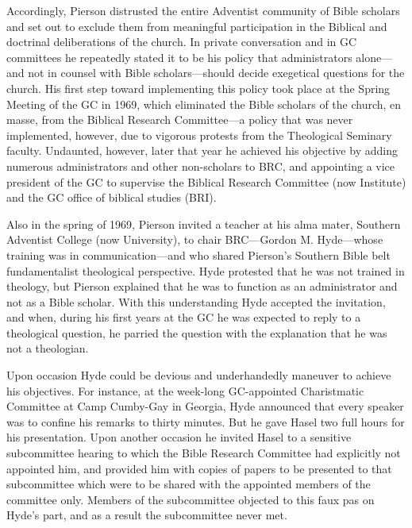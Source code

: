 Accordingly, Pierson distrusted the entire Adventist community of Bible
scholars and set out to exclude them from meaningful participation in the 
Biblical and doctrinal deliberations of the church. In private conversation
and in GC committees he repeatedly stated it to be his policy that
administrators alone---and not in counsel with Bible scholars---should
decide exegetical questions for the church. His first step toward
implementing this policy took place at the Spring Meeting of the GC in 1969,
which eliminated the Bible scholars of the church, en masse, from the
Biblical Research Committee---a policy that was never implemented, however,
due to vigorous protests from the Theological Seminary faculty. Undaunted,
however, later that year he achieved his objective by adding numerous
administrators and other non-scholars to BRC, and appointing a vice
president of the GC to supervise the Biblical Research Committee (now
Institute) and the GC office of biblical studies (BRI).

Also in the spring of 1969, Pierson invited a teacher at his alma mater,
Southern Adventist College (now University), to chair BRC---Gordon M.
Hyde---whose training was in communication---and who shared Pierson's
Southern Bible belt fundamentalist theological perspective. Hyde protested
that he was not trained in theology, but Pierson explained that he was to
function as an administrator and not as a Bible scholar. With this
understanding Hyde accepted the invitation, and when, during his first years
at the GC he was expected to reply to a theological question, he parried the
question with the explanation that he was not a theologian.

Upon occasion Hyde could be devious and underhandedly maneuver to achieve
his objectives. For instance, at the week-long GC-appointed Charistmatic
Committee at Camp Cumby-Gay in Georgia, Hyde announced that every speaker
was to confine his remarks to thirty minutes. But he gave Hasel two full
hours for his presentation. Upon another occasion he invited Hasel to a
sensitive subcommittee hearing to which the Bible Research Committee had
explicitly not appointed him, and provided him with copies of papers to be
presented to that subcommittee which were to be shared with the appointed
members of the committee only. Members of the subcommittee objected to this
faux pas on Hyde's part, and as a result the subcommittee never met.\cite{145}


